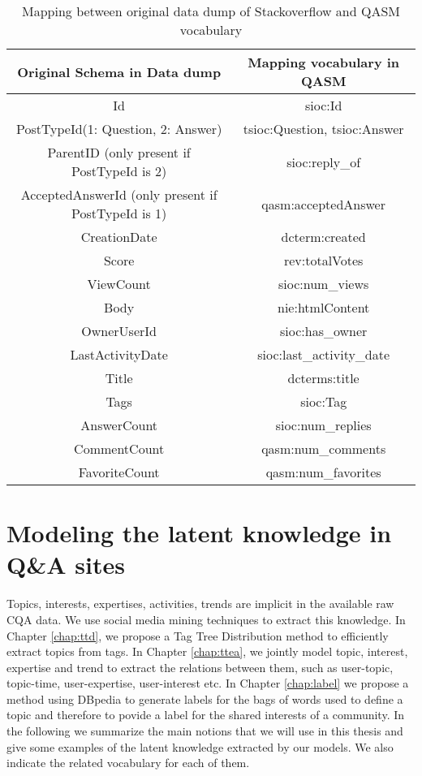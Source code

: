 \begin{sidewaystable}
    \centering
    \begin{tabular}{|c|c|}
    \hline
    Original Schema in Data dump & Mapping vocabulary in QASM \\ \hline
        Id       &  sioc:Id \\ \hline
        PostTypeId(1: Question, 2: Answer) & tsioc:Question, tsioc:Answer   \\ \hline
        ParentID (only present if PostTypeId is 2) & sioc:reply\_of   \\ \hline
        AcceptedAnswerId (only present if PostTypeId is 1) & qasm:acceptedAnswer  \\ \hline 
        CreationDate & dcterm:created \\ \hline
        Score & rev:totalVotes \\ \hline
        ViewCount & sioc:num\_views \\ \hline
        Body & nie:htmlContent\\ \hline
        OwnerUserId & sioc:has\_owner \\ \hline
        LastActivityDate & sioc:last\_activity\_date\\ \hline
        Title & dcterms:title\\ \hline
        Tags & sioc:Tag\\ \hline
        AnswerCount & sioc:num\_replies\\ \hline
        CommentCount & qasm:num\_comments\\ \hline
        FavoriteCount & qasm:num\_favorites\\ \hline
    \end{tabular}
    \caption{Mapping between original data dump of Stackoverflow and QASM vocabulary}
    \label{tab:mappingstackoverflow}
\end{sidewaystable}


\section{Modeling the latent knowledge in Q\&A sites}

Topics, interests, expertises, activities, trends are implicit  in the available raw CQA data. We use social media mining techniques to extract this knowledge.
In Chapter \ref{chap:ttd}, we propose a Tag Tree Distribution method to efficiently extract topics from tags. In Chapter \ref{chap:ttea}, we jointly model topic, interest, expertise and trend to extract the relations between them, such as user-topic, topic-time, user-expertise, user-interest etc. In Chapter \ref{chap:label} we propose a method using DBpedia to generate labels for the bags of words  used to define a topic and therefore to povide a label for the shared interests of a community. 
In the following we summarize the main notions that we will use in this thesis and give some examples of the latent knowledge extracted by our models. We also indicate the related vocabulary for each of them.

